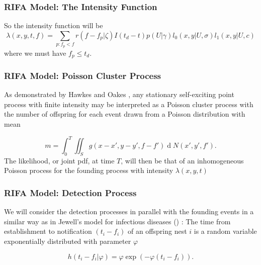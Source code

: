 \documentclass[9pt, xcolor={dvipsnames,svgnames,table}]{beamer}
\renewcommand{\d}[1]{\ensuremath{\operatorname{d}\!{#1}}}
\begin{document}
\begin{frame}
    \frametitle{RIFA Model: The Intensity Function}
    So \textcolor{PineGreen}{the intensity function will be}
    \begin{equation*}
        \lambda(x, y, t, f) = \sum_{p:f_p < f} r(f - f_p | \zeta) I(t_d - t) p(U | \gamma) l_0(x, y | U, \sigma) l_1(x, y | U, c)
    \end{equation*}
    where we must have $f_p\leq t_d$.
\end{frame}





\begin{frame}
\frametitle{RIFA Model: Poisson Cluster Process}
    As demonstrated by Hawkes and Oakes \cite{Hawkes74}, any stationary self-exciting point process with finite intensity may be interpreted as a Poisson cluster process with the number of offspring for each event drawn from a Poisson distribution with mean 

    \begin{equation*}
        m = \int_0^T \iint_S g(x-x', y-y', f-f')\d N(x', y', f').
    \end{equation*}
    The likelihood, or joint pdf, at time $T$, will then be that of an inhomogeneous Poisson process for the founding process with intensity $\lambda(x, y, t)$
\end{frame}




\begin{frame}
\frametitle{RIFA Model: Detection Process}
    We will consider the detection processes in parallel with the founding events in a similar way as in Jewell's model for infectious diseases (\cite{Jewell}) : The time from establishment to notification $(t_i - f_i)$ of an offspring nest $i$ is a random variable exponentially distributed with parameter $\varphi$

    \begin{equation*}
    h(t_{i} - f_{i} | \varphi) = \varphi \exp (- \varphi(t_{i} - f_{i})).
    \end{equation*}
\end{frame}
\end{document}
